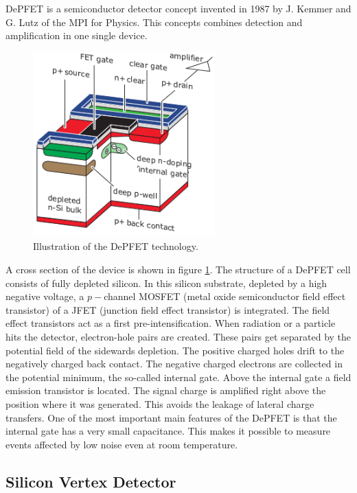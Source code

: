 \documentclass[a4paper,11pt,twosided,final,german,openbib,pdftex,listof=totoc,bibliography=totoc]{scrbook}
\begin{document}
DePFET is a semiconductor detector concept invented in 1987 by J. Kemmer and G. Lutz of the MPI for Physics. This concepts combines detection and amplification in one single device. \cite{B2TR}

\begin{figure}[h!]
	\begin{center}
		\includegraphics[width=7cm]{Bilder/DEPFET}
	\end{center}
\caption[DePFET]{Illustration of the DePFET technology.\cite{B2TR}}
\label{fig:DePFET}
\end{figure}

A cross section of the device is shown in figure \ref{fig:DePFET}. The structure of a DePFET cell consists of fully depleted silicon. In this silicon substrate, depleted by a high negative voltage, a $p-$channel MOSFET (metal oxide semiconductor field effect transistor) of a JFET (junction field effect transistor) is integrated. The field effect transistors act as a first pre-intensification. When radiation or a particle hits the detector, electron-hole pairs are created. These pairs get separated by the potential field of the sidewards depletion. The positive charged holes drift to the negatively charged back contact. The negative charged electrons are collected in the potential minimum, the so-called internal gate. Above the internal gate a field emission transistor is located. The signal charge is amplified right above the position where it was generated. This avoids the leakage of lateral charge transfers. One of the most important main features of the DePFET is that the internal gate has a very small capacitance. This makes it possible to measure events affected by low noise even at room temperature.\cite{B2TR}

\subsection{Silicon Vertex Detector}
\label{sec:Silicon}
\end{document}
